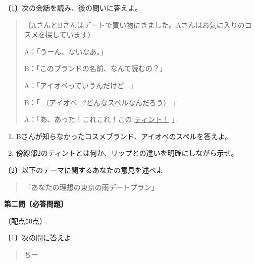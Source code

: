 \documentclass[b5j]{jsarticle}
\newcommand{\bou}[2]{%
\underline{#2}\fbox{\scriptsize #1}
}
\begin{document}
\vspace{1em}

\noindent
〔1〕次の会話を読み、後の問いに答えよ。

\vspace{0.5em}

\begin{quote}
  （AさんとBさんはデートで買い物にきました。Aさんはお気に入りのコスメを探しています）


A：「うーん、ないなあ。」

B：「このブランドの名前、なんて読むの？」

A：「アイオペっていうんだけど...」

B：「\bou{1}{（アイオペ...?どんなスペルなんだろう）}」

A：「あ、あった！これこれ！この\bou{2}{ティント！}」

\end{quote}

\vspace{1em}

\begin{enumerate}
\item Bさんが知らなかったコスメブランド、アイオペのスペルを答えよ。



\vspace{5em}

\item 傍線部2のティントとは何か、リップとの違いを明確にしながら示せ。

\end{enumerate}
〔2〕以下のテーマに関するあなたの意見を述べよ　
\vspace{1em}
\begin{quote}
「あなたの理想の東京の雨デートプラン」
\end{quote}
\newpage
\begin{center}
{\Large\bfseries 第二問〔必答問題〕}

\vspace{0.5em}
（配点50点）
\end{center}
\vspace{1em}
\noindent
〔1〕次の問に答えよ
\vspace{0.5em}
\begin{quote}
  ちー
\end{quote}
\newpage
\vspace{10em}
\end{document}

